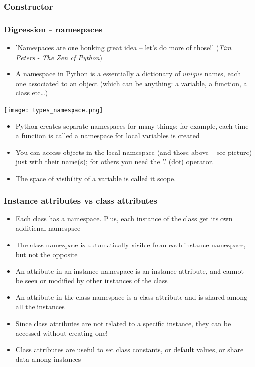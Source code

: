 \documentclass[9pt]{beamer}
\begin{document}
\begin{frame}
  \frametitle{Constructor}
  
\end{frame}


\begin{frame}
  \frametitle{Digression - namespaces}
  
  \begin{itemize}
    \small
    \item 'Namespaces are one honking great idea -- let's do more of those!'
            (\emph{Tim Peters - The Zen of Python})
    \medskip
    \item A \alert{namespace} in Python is a essentially a dictionary of \emph{unique} names, each one associated to an object (which can be anything: a variable, a function, a class etc\dots)
    \medskip
  \end{itemize}
  
  \centering\texttt{[image: types\_namespace.png]}
  
  \begin{itemize}
    \small
    \item Python creates separate namespaces for many things: for example, each time a function is called a namespace for local variables is created
    \medskip 
    \item You can access objects in the local namespace (and those above -- 
          see picture) just with their name(s); for others you need
          the '.' (dot) operator.
    \medskip
    \item The space of visibility of a variable is called it \alert{scope}.
  \end{itemize}
  
\end{frame}


\begin{frame}
  \frametitle{Instance attributes vs class attributes}
  
  \begin{itemize}
    \small
    \item Each class has a namespace. Plus, each instance of the class get its own additional namespace
    \medskip
    \item The class namespace is automatically visible from each instance namespace, but not the opposite
    \medskip
    \item An attribute in an instance namespace is an \alert{instance attribute}, and cannot be seen or modified
          by other instances of the class
    \medskip
    \item An attribute in the class namespace is a \alert{class attribute} and is shared among all the instances
    \medskip
    \item Since class attributes are not related to a specific instance, they can be accessed without creating one!
    \medskip
    \item Class attributes are useful to set class constants, or default values, or share data among instances 
  \end{itemize}
  
\end{frame}
\end{document}
